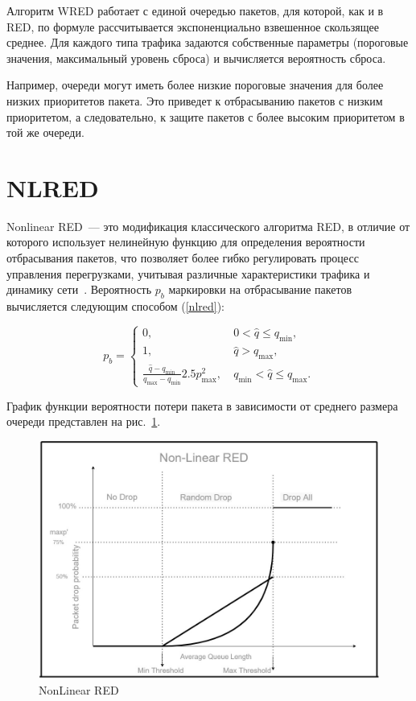 Алгоритм WRED работает с единой очередью пакетов, для которой, как и в
RED, по формуле рассчитывается экспоненциально взвешенное скользящее
среднее. Для каждого типа трафика задаются собственные параметры
(пороговые значения, максимальный уровень сброса) и вычисляется
вероятность сброса.

Например, очереди могут иметь более низкие пороговые значения для
более низких приоритетов пакета. Это приведет к отбрасыванию пакетов с
низким приоритетом, а следовательно, к защите пакетов с более высоким
приоритетом в той же очереди.

\section{NLRED}

Nonlinear RED~--- это модификация классического алгоритма RED, в
отличие от которого использует нелинейную функцию для определения
вероятности отбрасывания пакетов, что позволяет более гибко
регулировать процесс управления перегрузками, учитывая различные
характеристики трафика и динамику
сети~\cite{NLRED1,NLRED2}. Вероятность $p_{b}$ маркировки на
отбрасывание пакетов вычисляется следующим способом (\ref{nlred}):

\begin{equation}
\label{nlred}
p_{b} = \begin{cases}
        0, &  \ 0 < \hat{q} \leqslant q_{\min},
        \\
        1, &  \ \hat{q} > q_{\max},
        \\
        \frac{\hat{q} - q_{\min}}{q_{\max} - q_{\min}} {2.5p^{2}_{\max}}, & \ q_{\min} < \hat{q} \leqslant q_{\max}.
\end{cases}
\end{equation}

График функции вероятности потери пакета в зависимости от среднего
размера очереди представлен на  рис.~\ref{fig:2.4}.

\begin{figure}[!h]
  \centering
  \includegraphics[width=0.7\linewidth]{image/NonLinearRED.png}
  \caption{NonLinear RED}
  \label{fig:2.4}
\end{figure}

